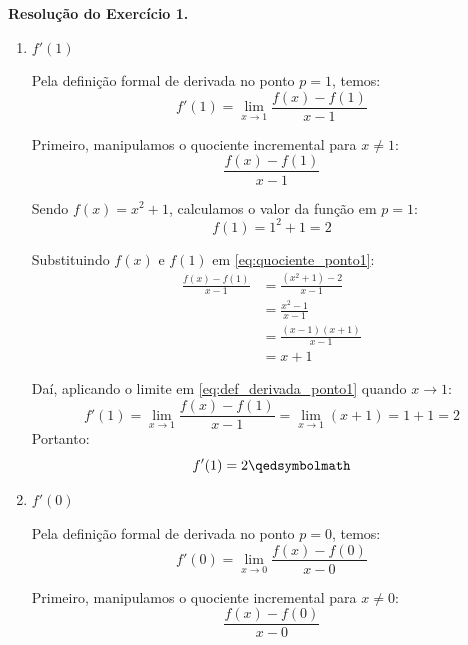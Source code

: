 \vspace{0.6cm}
\noindent\textbf{Resolução do Exercício 1.}
\label{res:7.2.1}

\begin{enumerate}[label=\alph*)]

    \item $f'(1)$
    \setcounter{equation}{0}

    Pela definição formal de derivada no ponto $p = 1$, temos:
    \begin{equation}
        f'(1) = \lim_{x \to 1} \frac{f(x) - f(1)}{x - 1} \label{eq:def_derivada_ponto1}
    \end{equation}

    Primeiro, manipulamos o quociente incremental para $x \neq 1$:
    \begin{equation}
        \frac{f(x) - f(1)}{x - 1} \label{eq:quociente_ponto1}
    \end{equation}

    Sendo $f(x) = x^2 + 1$, calculamos o valor da função em $p = 1$:
    \[
    f(1) = 1^2 + 1 = 2
    \]

    Substituindo $f(x)$ e $f(1)$ em \eqref{eq:quociente_ponto1}:
    \begin{align*}
        \frac{f(x) - f(1)}{x - 1} &= \frac{(x^2 + 1) - 2}{x - 1} \\[0.25cm]
        &= \frac{x^2 - 1}{x - 1} \\[0.25cm]
        &= \frac{(x - 1)(x + 1)}{x - 1} \\[0.25cm]
        &= x + 1
    \end{align*}

    Daí, aplicando o limite em \eqref{eq:def_derivada_ponto1} quando $x \to 1$:
    \[
    f'(1) = \lim_{x \to 1} \frac{f(x) - f(1)}{x - 1} = \lim_{x \to 1} (x + 1) = 1 + 1 = 2
    \]
    Portanto:
    \[
    f'(1) = 2 \qedsymbolmath
    \]

    \item $f'(0)$
    \setcounter{equation}{0}

    Pela definição formal de derivada no ponto $p = 0$, temos:
    \begin{equation}
        f'(0) = \lim_{x \to 0} \frac{f(x) - f(0)}{x - 0} \label{eq:def_derivada_ponto0}
    \end{equation}

    Primeiro, manipulamos o quociente incremental para $x \neq 0$:
    \begin{equation}
        \frac{f(x) - f(0)}{x - 0} \label{eq:quociente_ponto0}
    \end{equation}


\end{enumerate}
